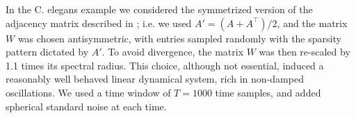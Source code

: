 In the C. elegans example we considered the symmetrized version of the adjacency matrix described in \citep{varshney2011structural}; i.e. we used $A'=(A+A^\top)/2$, and the matrix $W$ was chosen antisymmetric, with entries sampled randomly with the sparsity pattern dictated by $A'$. To avoid divergence, the matrix $W$ was then re-scaled by 1.1 times its spectral radius. This choice, although not essential, induced a reasonably well behaved linear dynamical system, rich in non-damped oscillations. We used a time window of $T=1000$ time samples, and added spherical standard noise at each time. 
